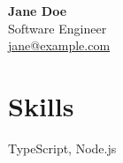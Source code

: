 \documentclass[11pt,a4paper]{article}
\begin{document}
{\LARGE\textbf{ Jane Doe }}\\
Software Engineer\\
\href{mailto:jane@example.com }{ jane@example.com }





\section*{Skills}
TypeScript, Node.js
\end{document}
